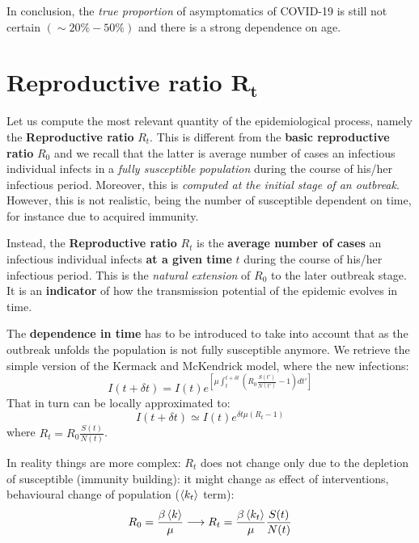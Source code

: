 \documentclass[../main/main.tex]{subfiles}
\begin{document}
In conclusion, the \textit{true proportion} of asymptomatics of COVID-19 is still not certain $(\sim 20\%-50\%)$ and there is a strong dependence on age.



\section{Reproductive ratio $\pmb{R_t}$}

Let us compute the most relevant quantity of the epidemiological process, namely the \textbf{Reproductive ratio} $R_t$. This is different from the \textbf{basic reproductive ratio} $R_0$ and we recall that the latter is average number of cases an infectious individual infects in a \textit{fully susceptible population} during the course of his/her infectious period. Moreover, this is \textit{computed at the initial stage of an outbreak}. However, this is not realistic, being the number of susceptible dependent on time, for instance due to acquired immunity.

Instead, the \textbf{Reproductive ratio} $R_t$ is the \textbf{average number of cases} an infectious individual infects \textbf{at a given time} $t$ during the course of his/her infectious period. This is the \textit{natural extension} of $R_0$ to the later outbreak stage. It is an \textbf{indicator} of how the transmission potential of the epidemic evolves in time.

The \textbf{dependence in time} has to be introduced to take into account that as the outbreak unfolds the population is not fully susceptible anymore. We retrieve the simple version of the Kermack and McKendrick model, where the new infections:
\begin{equation}
    I(t+\delta t) = I(t) e^{\left[ \mu \int_t^{t+\delta t} \left( R_0 \frac{S(t')}{N(t')} - 1 \right) dt' \right]}
\end{equation}
That in turn can be locally approximated to:
\begin{equation}
    I(t+\delta t) \simeq I(t) e^{\delta t \mu (R_t - 1)}
\end{equation}
where $R_t = R_0 \frac{S(t)}{N(t)}$.

In reality things are more complex: $R_t$ does not change only due to the depletion of susceptible (immunity building): it might change as effect of interventions, behavioural change of population ($\expval{k_t}$ term):
\begin{equation}
    R_0 = \frac{\beta \expval{k}}{\mu} \longrightarrow R_t = \frac{\beta \expval{k_t}}{\mu} \frac{S(t)}{N(t)}
\end{equation}
\end{document}
